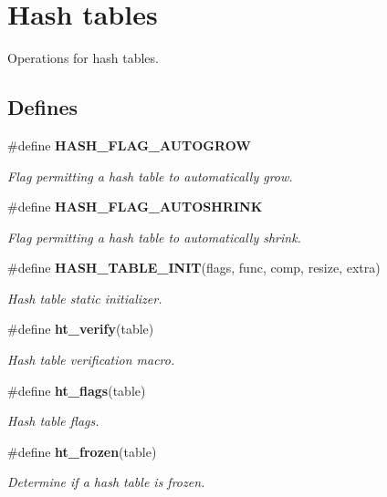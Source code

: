 \section{Hash tables}
\label{group__dbprim__hash}
Operations for hash tables. 
\subsection*{Defines}
\begin{CompactItemize}
\item 
\#define {\bf HASH\_\-FLAG\_\-AUTOGROW}
\begin{CompactList}\small\item\em Flag permitting a hash table to automatically grow.\item\end{CompactList}\item 
\#define {\bf HASH\_\-FLAG\_\-AUTOSHRINK}
\begin{CompactList}\small\item\em Flag permitting a hash table to automatically shrink.\item\end{CompactList}\item 
\#define {\bf HASH\_\-TABLE\_\-INIT}(flags, func, comp, resize, extra)
\begin{CompactList}\small\item\em Hash table static initializer.\item\end{CompactList}\item 
\#define {\bf ht\_\-verify}(table)
\begin{CompactList}\small\item\em Hash table verification macro.\item\end{CompactList}\item 
\#define {\bf ht\_\-flags}(table)
\begin{CompactList}\small\item\em Hash table flags.\item\end{CompactList}\item 
\#define {\bf ht\_\-frozen}(table)
\begin{CompactList}\small\item\em Determine if a hash table is frozen.\item\end{CompactList}\item 

\end{CompactItemize}
